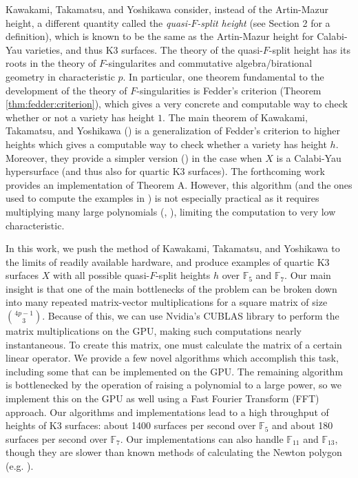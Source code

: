 Kawakami, Takamatsu, and Yoshikawa consider, 
instead of the Artin-Mazur height, a different quantity called the
\textit{quasi-\(F\)-split height} 
(see Section 2 for a definition),
which is known to be the same as the Artin-Mazur height
for Calabi-Yau varieties, and thus K3 surfaces.
The theory of the quasi-\(F\)-split height has its
roots in the theory of \(F\)-singularites and commutative
algebra/birational geometry in characteristic \(p\).
In particular, one theorem fundamental
to the development of the theory of \(F\)-singularities
is Fedder's criterion (Theorem \ref{thm:fedder:criterion}), 
which gives a very concrete and computable way to check
whether or not a variety has height \(1\).
The main theorem of Kawakami, Takamatsu, and Yoshikawa
(\cite[Theorem~A]{kty-2022-fedder})
is a generalization of Fedder's criterion
to higher heights which gives a 
computable way to check whether a variety has height \(h\).
Moreover, they provide a simpler version
(\cite[Theorem~C]{kty-2022-fedder})
in the case when \(X\) is a Calabi-Yau hypersurface
(and thus also for quartic K3 surfaces).
The forthcoming work 
\cite{fgmq-2025-witt-vectors-macaulay2} 
provides an implementation of Theorem A.
However, this algorithm (and the ones used to compute
the examples
in \cite{kty-2022-fedder}) is not especially practical
as it requires multiplying many large polynomials
(\cite{takamatsu-2024-algorithm}, 
\cite{fgmq-2025-witt-vectors-macaulay2}),
limiting the computation to
very low characteristic.

In this work, we push the method of Kawakami,
Takamatsu, and Yoshikawa to the limits of readily
available hardware, 
and produce examples of quartic K3 surfaces \(X\) with all
possible quasi-\(F\)-split heights \(h\) 
over \(\mathbb{F}_{5}\) and \(\mathbb{F}_{7}\).
Our main insight is that one of the main
bottlenecks of the problem can be broken down 
into many repeated matrix-vector
multiplications for a square matrix of size 
\(\binom{4p-1}{3}\).
Because of this, we can use Nvidia's CUBLAS library 
\cite{nvidia-2024-cublas}
to perform the matrix multiplications
on the GPU, making such computations
nearly instantaneous.
To create this matrix, one must calculate the matrix of a
certain linear operator.
We provide a few novel algorithms which accomplish this task,
including some that can be implemented on the GPU.
The remaining algorithm is bottlenecked by the operation
of raising a polynomial to a large power, 
so we implement this on the GPU as well using 
a Fast Fourier Transform (FFT) approach.
Our algorithms and implementations lead to a high throughput
of heights of K3 surfaces: 
about 1400 surfaces per second over \(\mathbb{F}_{5}\) and
about 180 surfaces per second over \(\mathbb{F}_{7}\).
Our implementations can also handle \(\mathbb{F}_{11}\) 
and \(\mathbb{F}_{13}\), though they are slower than known methods
of calculating the Newton polygon (e.g. 
\cite{chk-2019-toric-controlled-reduction}).

